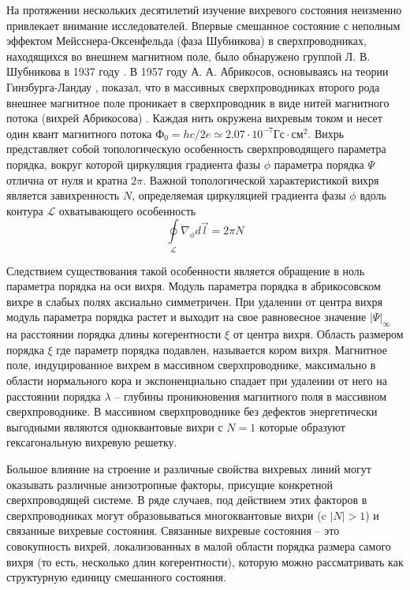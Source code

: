 На протяжении нескольких десятилетий изучение вихревого состояния неизменно 
привлекает внимание исследователей. Впервые смешанное состояние с неполным 
эффектом Мейсснера-Оксенфельда (фаза Шубникова) в сверхпроводниках, 
находящихся во внешнем магнитном поле, было обнаружено группой Л. В. 
Шубникова в 1937 году \cite{shubnikov}. В 1957 году А. А. Абрикосов, 
основываясь на теории Гинзбурга-Ландау \cite{ginzburg-landau}, показал, что в 
массивных сверхпроводниках второго рода внешнее магнитное поле проникает в 
сверхпроводник в виде нитей магнитного потока (вихрей Абрикосова)
\cite{abrikosov}. Каждая нить окружена вихревым током и несет один квант 
магнитного потока 
\( Ф_0 = hc/2e \simeq 2.07\cdot10^{-7} \text{Гс}\cdot\text{см}^2 \). Вихрь 
представляет собой топологическую особенность сверхпроводящего параметра 
порядка, вокруг которой циркуляция градиента фазы \( \phi \) параметра порядка 
\( \Psi \) отлична от нуля и кратна \( 2\pi \). Важной топологической 
характеристикой вихря является завихренность \( N \), определяемая циркуляцией 
градиента фазы \( \phi \) вдоль контура \( \mathcal{L} \) охватывающего 
особенность 
\begin{equation}
    \oint\limits_{\mathcal{L}} \nabla_\phi d\vec{l} = 2\pi N
\end{equation}

Следствием существования такой особенности является обращение в ноль параметра 
порядка на оси вихря. Модуль параметра порядка в абрикосовском вихре в слабых 
полях аксиально симметричен. При удалении от центра вихря модуль параметра 
порядка растет и выходит на свое равновесное значение \( |\Psi|_\infty \) на 
расстоянии порядка длины когерентности \( \xi \) от центра вихря. Область 
размером порядка \( \xi \) где параметр порядка подавлен, называется кором 
вихря. Магнитное поле, индуцированное вихрем в массивном сверхпроводнике, 
максимально в области нормального кора и экспоненциально спадает при удалении 
от него на расстоянии порядка \( \lambda \) -- глубины проникновения магнитного 
поля в массивном сверхпроводнике. В массивном сверхпроводнике без дефектов 
энергетически выгодными являются одноквантовые вихри с \( N = 1 \) которые 
образуют гексагональную вихревую решетку.

Большое влияние на строение и различные свойства вихревых линий могут 
оказывать различные анизотропные факторы, присущие конкретной сверхпроводящей 
системе. В ряде случаев, под действием этих факторов в сверхпроводниках могут 
образовываться многоквантовые вихри (c \( |N|>1 \)) и связанные вихревые
состояния. Связанные вихревые состояния -- это совокупность вихрей, 
локализованных в малой области порядка размера самого вихря (то есть, 
несколько длин когерентности), которую можно рассматривать как структурную 
единицу смешанного состояния.

